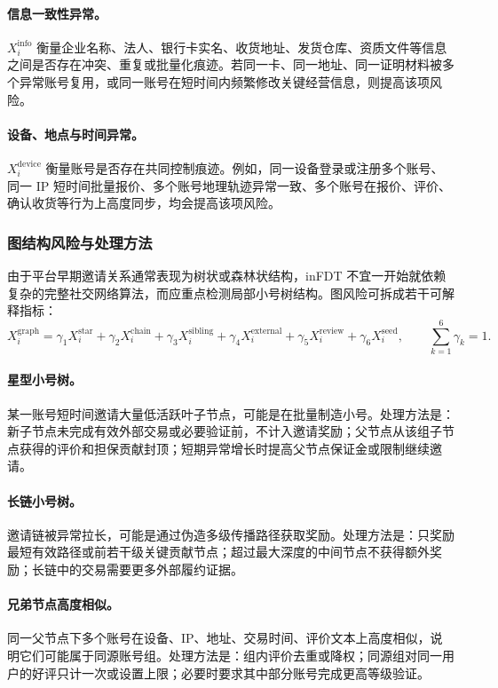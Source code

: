 \documentclass[UTF8,a4paper,12pt]{ctexart}
\begin{document}
\paragraph{信息一致性异常。}
$X_i^{\mathrm{info}}$ 衡量企业名称、法人、银行卡实名、收货地址、发货仓库、资质文件等信息之间是否存在冲突、重复或批量化痕迹。若同一卡、同一地址、同一证明材料被多个异常账号复用，或同一账号在短时间内频繁修改关键经营信息，则提高该项风险。

\paragraph{设备、地点与时间异常。}
$X_i^{\mathrm{device}}$ 衡量账号是否存在共同控制痕迹。例如，同一设备登录或注册多个账号、同一 IP 短时间批量报价、多个账号地理轨迹异常一致、多个账号在报价、评价、确认收货等行为上高度同步，均会提高该项风险。

\subsubsection{图结构风险与处理方法}

由于平台早期邀请关系通常表现为树状或森林状结构，inFDT 不宜一开始就依赖复杂的完整社交网络算法，而应重点检测局部小号树结构。图风险可拆成若干可解释指标：
\[
    X_i^{\mathrm{graph}}
    =
    \gamma_1X_i^{\mathrm{star}}
    +
    \gamma_2X_i^{\mathrm{chain}}
    +
    \gamma_3X_i^{\mathrm{sibling}}
    +
    \gamma_4X_i^{\mathrm{external}}
    +
    \gamma_5X_i^{\mathrm{review}}
    +
    \gamma_6X_i^{\mathrm{seed}},
    \qquad
    \sum_{k=1}^{6}\gamma_k=1.
\]

\paragraph{星型小号树。}
某一账号短时间邀请大量低活跃叶子节点，可能是在批量制造小号。处理方法是：新子节点未完成有效外部交易或必要验证前，不计入邀请奖励；父节点从该组子节点获得的评价和担保贡献封顶；短期异常增长时提高父节点保证金或限制继续邀请。

\paragraph{长链小号树。}
邀请链被异常拉长，可能是通过伪造多级传播路径获取奖励。处理方法是：只奖励最短有效路径或前若干级关键贡献节点；超过最大深度的中间节点不获得额外奖励；长链中的交易需要更多外部履约证据。

\paragraph{兄弟节点高度相似。}
同一父节点下多个账号在设备、IP、地址、交易时间、评价文本上高度相似，说明它们可能属于同源账号组。处理方法是：组内评价去重或降权；同源组对同一用户的好评只计一次或设置上限；必要时要求其中部分账号完成更高等级验证。
\end{document}
